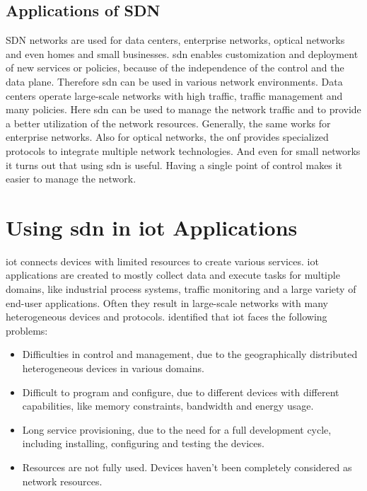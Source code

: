 \documentclass[conference]{IEEEtran}
\begin{document}
	\subsection{Applications of SDN}

	SDN networks are used for data centers, enterprise networks, optical networks and even homes and small businesses. \ac{sdn} enables customization and deployment of new services or policies, because of the independence of the control and the data plane. Therefore \ac{sdn} can be used in various network environments. Data centers operate large-scale networks with high traffic, traffic management and many policies. Here \ac{sdn} can be used to manage the network traffic and to provide a better utilization of the network resources. Generally, the same works for enterprise networks. Also for optical networks, the \ac{onf} provides specialized protocols to integrate multiple network technologies. And even for small networks it turns out that using \ac{sdn} is useful. Having a single point of control makes it easier to manage the network. \cite{Jefia2018-pj} 



	\section{Using \ac{sdn} in \ac{iot} Applications}
	\label{section:sdn-iot}

	\acf{iot} connects devices with limited resources to create various services. \ac{iot} applications are created to mostly collect data and execute tasks for multiple domains, like industrial process systems, traffic monitoring and a large variety  of end-user applications. Often they result in large-scale networks with many heterogeneous devices and protocols. \cite{Li2020-lx} \citeauthor{Li2020-lx} identified that \ac{iot} faces the following problems: 

	\begin{itemize}
		\item Difficulties in control and management, due to the geographically distributed heterogeneous devices in various domains.
		\item Difficult to program and configure, due to different devices with different capabilities, like memory constraints, bandwidth and energy usage.
		\item Long service provisioning, due to the need for a full development cycle, including installing, configuring and testing the devices. 
		\item Resources are not fully used. Devices haven't been completely considered as network resources. \cite{Sahrish2017}
	\end{itemize}
\end{document}
